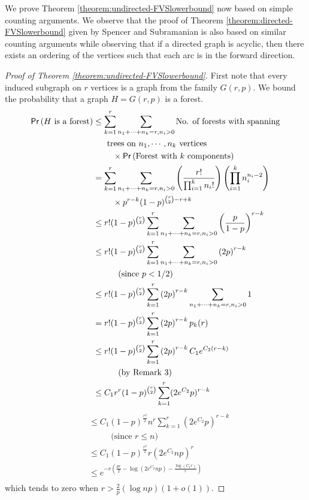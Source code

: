 \documentclass[11pt]{article}
\newcommand{\prob}[1]{{\sf Pr}\left(#1\right)}
\begin{document}
We prove Theorem \ref{theorem:undirected-FVSlowerbound} now based on simple counting arguments. We observe that the proof of Theorem \ref{theorem:directed-FVSlowerbound} given by Spencer and Subramanian is also based on similar counting arguments while observing that if a directed graph is acyclic, then there exists an ordering of the vertices such that each arc is in the forward direction.
\begin{proof}[Proof of Theorem \ref{theorem:undirected-FVSlowerbound}]
First note that every induced subgraph on $r$ vertices is a graph from the family $G(r,p)$. We bound the probability that a graph $H=G(r,p)$ is a forest.\\

\begin{align*}
\prob{H\ \text{is a forest}}&\leq \sum_{k=1}^r \sum_{n_1+\cdots+n_k=r, n_i>0} \text{No. of forests with spanning}\\
&\ \ \ \ \ \text{trees on $n_1,\cdots,n_k$ vertices}\\
&\ \ \ \ \ \ \  \times \prob{\text{Forest with $k$ components}}\\
&= \sum_{k=1}^r \sum_{n_1+\cdots+n_k=r, n_i>0} \left(\frac{r!}{\prod_{i=1}^k n_i!}\right) \left(\prod_{i=1}^k n_i^{n_i-2} \right)\\
&\ \ \ \ \ \ \ \times p^{r-k}(1-p)^{\binom{r}{2}-r+k}\\
&\leq r!(1-p)^{\binom{r}{2}} \sum_{k=1}^r \sum_{n_1+\cdots+n_k=r, n_i>0} \left(\frac{p}{1-p}\right)^{r-k}\\
&\leq r!(1-p)^{\binom{r}{2}} \sum_{k=1}^r \sum_{n_1+\cdots+n_k=r, n_i>0} \left(2p\right)^{r-k} \\
& \ \ \ \quad \quad \text{(since $p<1/2$)}\\
&\leq r!(1-p)^{\binom{r}{2}} \sum_{k=1}^r \left(2p\right)^{r-k} \sum_{n_1+\cdots+n_k=r, n_i>0} 1\\
&= r!(1-p)^{\binom{r}{2}} \sum_{k=1}^r \left(2p\right)^{r-k} p_k(r)\\
&\leq r!(1-p)^{\binom{r}{2}} \sum_{k=1}^r \left(2p\right)^{r-k} C_1 e^{C_2(r-k)} \\
& \ \ \ \quad \quad \text{(by Remark 3)}\\
&\leq C_1r^r(1-p)^{\binom{r}{2}} \sum_{k=1}^r (2e^{C_2}p)^{r-k}
\end{align*}
\begin{align*}
&\leq C_1(1-p)^{\frac{r^2}{2}}n^r \sum_{k=1}^r(2e^{C_2}p)^{r-k} \\
& \ \ \ \quad \quad \text{(since $r\leq n$)}\\
&\leq C_1(1-p)^{\frac{r^2}{2}}r(2e^{C_2}np)^r \\
& \leq e^{-r\left(\frac{pr}{2}-\log{(2e^{C_2}np)}-\frac{\log{(C_1r)}}{r}\right)}\\
\end{align*}
which tends to zero when $r>\frac{2}{p}(\log{np})(1+o(1))$.
\end{proof}
\end{document}
